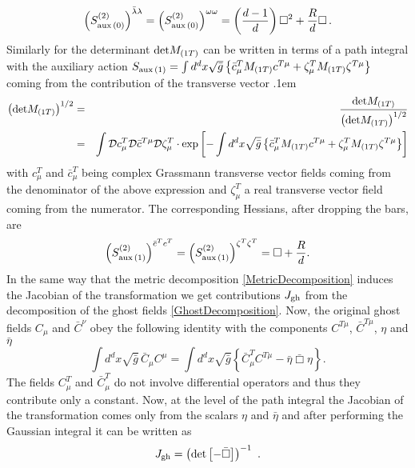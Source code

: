 \documentclass[notitlepage,eqsecnum,bm,amsmath,preprintnumbers,superscriptaddress,nofootinbib,aps,11pt]{revtex4-1}
\def\bea{\arraycolsep .1em \begin{eqnarray}}
\def\eea{\end{eqnarray}}
\begin{document}
\begin{equation}  \label{bare_aux0_hessian}
\left(S^{(2)}_{\rm aux\, (0)}\right)^{\bar\lambda\lambda}=\left( S^{(2)}_{\rm aux\, (0)}\right)^{\omega\omega}=\left(\frac{d-1}{d}\right)\Box^2+\frac{R}{d}\Box\,.
\end{equation}
Similarly for the determinant ${\rm det} M_{(1T)}$ can be written in terms of a path integral with the auxiliary action $S_{\rm aux\,(1)}=\int d^dx\sqrt{\bar g}\left\{\bar c^T_{\mu} M_{(1T)}c^{T\mu}+\zeta^T_{\mu} M_{(1T)}\zeta^{T\mu}\right\}$ coming from the contribution of the transverse vector
\bea
\left({\rm det} M_{(1T)}\right)^{1/2}&=&\frac{{\rm det} M_{(1T)}}{\left({\rm det} M_{(1T)}\right)^{1/2}}  \\
&=&\int \mathcal{D}c^T_{\mu}\mathcal{D}\bar c^{T\mu}\mathcal{D}\zeta^T_{\mu}\cdot\exp\left[-\int d^dx\sqrt{\bar g}\left\{\bar c^T_{\mu} M_{(1T)}c^{T\mu}+\zeta^T_{\mu} M_{(1T)}\zeta^{T\mu}\right\}\right] \nonumber
\eea
with $c^T_{\mu}$ and $\bar c^T_{\mu}$ being complex Grassmann transverse vector fields coming from the denominator of the above expression and $\zeta^T_{\mu}$ a real transverse vector field coming from the numerator. The corresponding Hessians, after dropping the bars, are
\begin{equation} \label{bare_aux1_hessian}
\left(S^{(2)}_{\rm aux\, (1)}\right)^{\bar c^Tc^T}=\left(S^{(2)}_{\rm aux\, (1)}\right)^{\zeta^T\zeta^T}=\Box + \frac{R}{d}.
\end{equation}
In the same way that the metric decomposition  \eqref{MetricDecomposition} induces the Jacobian of the transformation we get contributions $J_{\rm gh}$ from the decomposition of the ghost fields \eqref{GhostDecomposition}. Now, the original ghost fields $C_{\mu}$ and $\bar{C}^\nu$ obey the following identity with the components $C^{T\mu}$, $\bar C^{T\mu}$,  $\eta$ and $\bar \eta$
\begin{equation}
\int d^dx\sqrt{\bar g}\, \bar C_{\mu}C^{\mu} =\int d^dx\sqrt{\bar g} \left\{ \bar C^T_{\mu}C^{T\mu}-\bar\eta\bar\Box\eta\right\}.
\end{equation}
The fields $C^T_{\mu}$ and $\bar C^T_{\mu}$ do not involve differential operators and thus they contribute only a constant. Now, at the level of the path integral the Jacobian of the transformation comes only from the scalars $\eta$ and $\bar \eta$ and after performing the Gaussian integral it can be written as
\begin{equation}
J_{\rm gh}=\left(\textnormal{det}\left[-\bar\Box\right]\right)^{-1}\ .
\end{equation}
\end{document}
